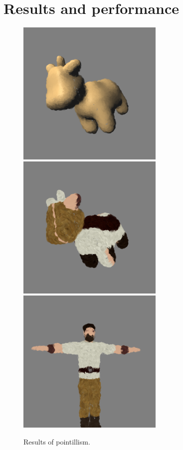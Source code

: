 \chapter{Results and performance}

\begin{figure}[H]
    \begin{center}
    \includegraphics[width=70mm, height=70mm]{Resultats/spotPoint/final.png}
    \includegraphics[width=70mm, height=70mm]{Resultats/spotPoint/final2.png}
    \includegraphics[width=70mm, height=70mm]{Resultats/pointCharacter/final.png}
    \end{center}
    \caption{Results of pointillism.}
    \label{results_point}
\end{figure}

